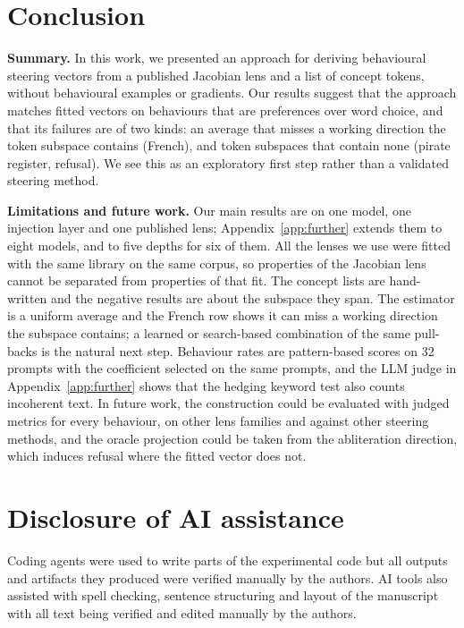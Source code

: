 \documentclass{article}
\begin{document}
\section{Conclusion}

\textbf{Summary.} In this work, we presented an approach for deriving behavioural steering vectors from a published Jacobian lens and a list of concept tokens, without behavioural examples or gradients. Our results suggest that the approach matches fitted vectors on behaviours that are preferences over word choice, and that its failures are of two kinds: an average that misses a working direction the token subspace contains (French), and token subspaces that contain none (pirate register, refusal). We see this as an exploratory first step rather than a validated steering method.

\textbf{Limitations and future work.} Our main results are on one model, one injection layer and one published lens; Appendix~\ref{app:further} extends them to eight models, and to five depths for six of them. All the lenses we use were fitted with the same library on the same corpus, so properties of the Jacobian lens cannot be separated from properties of that fit. The concept lists are hand-written and the negative results are about the subspace they span. The estimator is a uniform average and the French row shows it can miss a working direction the subspace contains; a learned or search-based combination of the same pull-backs is the natural next step. Behaviour rates are pattern-based scores on 32 prompts with the coefficient selected on the same prompts, and the LLM judge in Appendix~\ref{app:further} shows that the hedging keyword test also counts incoherent text. In future work, the construction could be evaluated with judged metrics for every behaviour, on other lens families and against other steering methods, and the oracle projection could be taken from the abliteration direction, which induces refusal where the fitted vector does not.

\section*{Disclosure of AI assistance}

Coding agents were used to write parts of the experimental code but all outputs and artifacts they produced were verified manually by the authors. AI tools also assisted with spell checking, sentence structuring and layout of the manuscript with all text being verified and edited manually by the authors.
\end{document}
